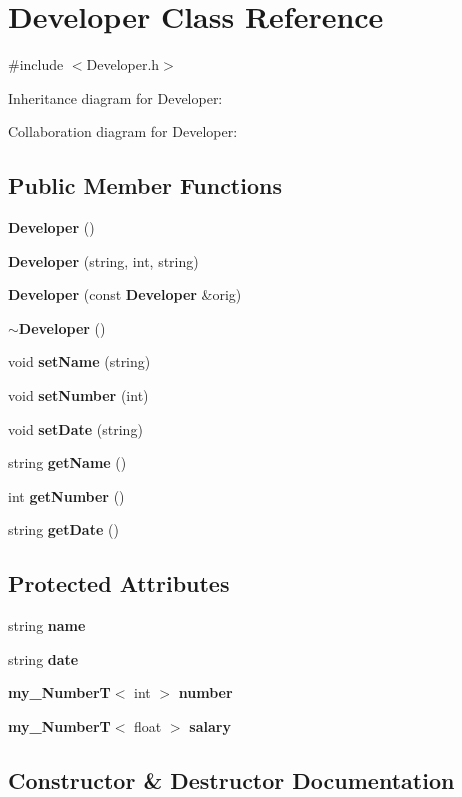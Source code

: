 \section{Developer Class Reference}
\label{class_developer}


{\ttfamily \#include $<$Developer.\+h$>$}



Inheritance diagram for Developer\+:


Collaboration diagram for Developer\+:
\subsection*{Public Member Functions}
\begin{DoxyCompactItemize}
\item 
{\bf Developer} ()
\item 
{\bf Developer} (string, int, string)
\item 
{\bf Developer} (const {\bf Developer} \&orig)
\item 
{\bf $\sim$\+Developer} ()
\item 
void {\bf set\+Name} (string)
\item 
void {\bf set\+Number} (int)
\item 
void {\bf set\+Date} (string)
\item 
string {\bf get\+Name} ()
\item 
int {\bf get\+Number} ()
\item 
string {\bf get\+Date} ()
\end{DoxyCompactItemize}
\subsection*{Protected Attributes}
\begin{DoxyCompactItemize}
\item 
string {\bf name}
\item 
string {\bf date}
\item 
{\bf my\+\_\+\+Number\+T}$<$ int $>$ {\bf number}
\item 
{\bf my\+\_\+\+Number\+T}$<$ float $>$ {\bf salary}
\end{DoxyCompactItemize}


\subsection{Constructor \& Destructor Documentation}
